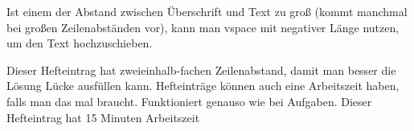 {
    \vspace{-0.6cm}
    
    Ist einem der Abstand zwischen Überschrift und Text zu groß (kommt manchmal bei großen Zeilenabständen vor), kann man vspace mit negativer Länge nutzen, um den Text hochzuschieben.

    Dieser Hefteintrag hat zweieinhalb-fachen Zeilenabstand, damit man besser die Lösung Lücke ausfüllen kann. Hefteinträge können auch eine Arbeitszeit haben, falls man das mal braucht. Funktioniert genauso wie bei Aufgaben. Dieser Hefteintrag hat 15 Minuten Arbeitszeit
}